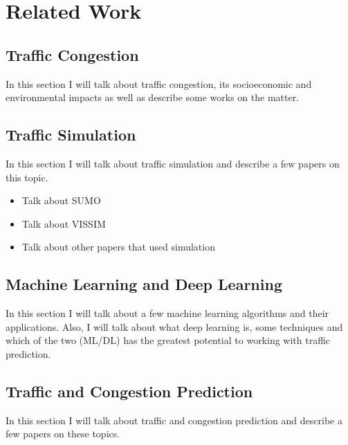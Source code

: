 \chapter{Related Work}
\label{chap:related_works}

\section{Traffic Congestion}
\label{sec:traffic_congestion}

In this section I will talk about traffic congestion, its socioeconomic and environmental impacts as well as describe some works on the matter.

\section{Traffic Simulation}
\label{sec:traffic_simulation}

In this section I will talk about traffic simulation and describe a few papers on this topic.

\begin{itemize}
	\item Talk about SUMO
	\item Talk about VISSIM
	\item Talk about other papers that used simulation
\end{itemize}

\section{Machine Learning and Deep Learning}
\label{sec:machine_learning_and_deep_learning}

In this section I will talk about a few machine learning algorithms and their applications. Also, I will talk about what deep learning is, some techniques and which of the two (ML/DL) has the greatest potential to working with traffic prediction.

\section{Traffic and Congestion Prediction}
\label{sec:traffic_prediction}

In this section I will talk about traffic and congestion prediction and describe a few papers on these topics.